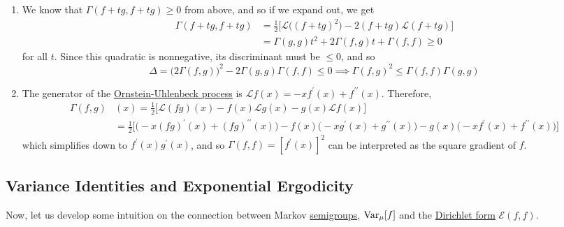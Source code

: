 \begin{solution}
\begin{enumerate}
      \item We know that $\Gamma(f + t g, f + tg) \geq 0$ from above, and so if we expand out, we get
      \begin{align}
        \Gamma(f + t g, f + tg) & = \frac{1}{2} \Big[ \mathscr{L} \big( (f + t g)^2 \big) - 2 (f + t g) \mathscr{L}(f + t g) \Big] \\
        & = \Gamma(g, g) t^2 + 2 \Gamma (f, g) t + \Gamma(f, f) \geq 0 
      \end{align}
      for all $t$. Since this quadratic is nonnegative, its discriminant must be $\leq 0$, and so 
      \begin{equation}
        \Delta = \big( 2 \Gamma (f, g) \big)^2 - 2 \Gamma(g, g) \Gamma(f, f) \leq 0 \implies \Gamma(f, g)^2 \leq \Gamma(f, f) \Gamma(g, g)
      \end{equation}
      
      \item The generator of the \hyperref[def:ornstein-uhlenbeck-process]{Ornstein-Uhlenbeck process} is $\mathscr{L}f(x) = -x f^\prime(x) + f^{\prime\prime} (x)$. Therefore, 
      \begin{align}
        \Gamma (f, g) & (x) = \frac{1}{2} \big[ \mathscr{L} (f g)(x) - f(x) \mathscr{L} g(x) - g(x) \mathscr{L} f (x) \big] \\
        & = \frac{1}{2} \Big[ \big( -x (f g)^\prime (x) + (f g)^{\prime\prime} (x) \big) - f(x) \big( -x g^\prime(x) + g^{\prime\prime} (x) \big) - g(x) \big( -x f^\prime(x) + f^{\prime\prime} (x) \big) \Big]
      \end{align}
      which simplifies down to $f^\prime(x) g^\prime(x)$, and so $\Gamma(f, f) = [ f^\prime(x)]^2$ can be interpreted as the square gradient of $f$. 
    \end{enumerate}
  \end{solution}

\subsection{Variance Identities and Exponential Ergodicity}

  Now, let us develop some intuition on the connection between Markov \hyperref[alg-def:semigroup]{semigroups}, $\operatorname{Var}_\mu [f]$ and the \hyperref[def:dirichlet-form]{Dirichlet form} $\mathcal{E}(f, f)$. 

